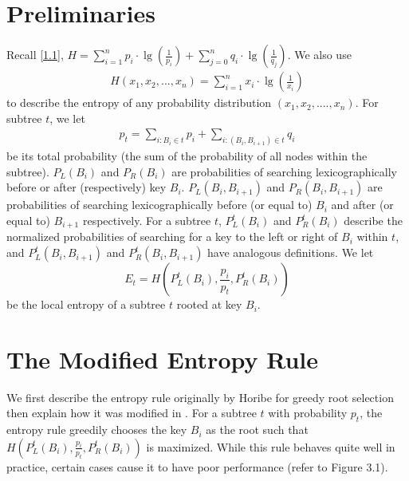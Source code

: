 \documentclass[letterpaper,12pt,titlepage,oneside,final]{book}
\theoremstyle{plain}
\begin{document}
\section{Preliminaries}

Recall \ref{1.1}, $H = \sum_{i=1}^{n} p_i\cdot\lg(\frac{1}{p_i}) + \sum_{j=0}^{n} q_i\cdot\lg(\frac{1}{q_j})$. We also use
\begin{align*}
H(x_1,x_2,...,x_n) = \sum_{i=1}^{n} x_i\cdot\lg(\frac{1}{x_i})
\end{align*} to describe the entropy of any probability distribution $(x_1, x_2, ...., x_n)$. For subtree $t$, we let 
\begin{align*}
p_t=\sum_{i : B_i \in t} p_i + \sum_{i : (B_i, B_{i+1}) \in t} q_i
\end{align*}
 be its total probability (the sum of the probability of all nodes within the subtree). $P_{L}(B_i)$ and $P_{R}(B_i)$ are probabilities of searching lexicographically before or after (respectively) key $B_i$. $P_{L}(B_i, B_{i+1})$ and $P_{R}(B_i, B_{i+1})$ are probabilities of searching lexicographically before (or equal to) $B_i$ and after (or equal to) $B_{i+1}$ respectively. For a subtree $t$, $P^t_L(B_i)$ and $P^t_R(B_i)$ describe the normalized probabilities of searching for a key to the left or right of $B_i$ within $t$, and $P^t_L(B_i,B_{i+1})$ and $P^t_R(B_i,B_{i+1})$ have analogous definitions. 
We let  
\begin{equation}
E_t=H(P^t_L(B_i), \frac{p_i}{p_t}, P^t_R(B_i))
\end{equation} be the local entropy of a subtree $t$ rooted at key $B_i$.  

\section{The Modified Entropy Rule}\label{The Modified Entropy Rule}

We first describe the entropy rule originally by Horibe \cite{horibe1977improved} for greedy root selection then explain how it was modified in \cite{guttler1980binary}. For a subtree $t$ with probability $p_t$, the entropy rule greedily chooses the key $B_i$ as the root such that $H(P^t_L(B_i), \frac{p_i}{p_t}, P^t_R(B_i))$ is maximized. While this rule behaves quite well in practice, certain cases cause it to have poor performance (refer to Figure 3.1). 
\end{document}
